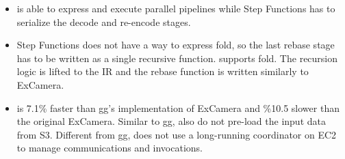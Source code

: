 \begin{itemize}

    \item \name{} is able to express and execute parallel pipelines while Step
    Functions has to serialize the decode and re-encode stages.

    \item Step Functions does not have a way to express fold, so the last
    rebase stage has to be written as a single recursive function. \name{}
    supports fold. The recursion logic is lifted to the \name{} IR and the
    rebase function is written similarly to ExCamera.

    \item \name{} is 7.1\% faster than gg's implementation of ExCamera and
    \%10.5 slower than the original ExCamera. Similar to gg, \name{} also do
    not pre-load the input data from S3. Different from gg, \name{} does not
    use a long-running coordinator on EC2 to manage communications and
    invocations.

\end{itemize}











